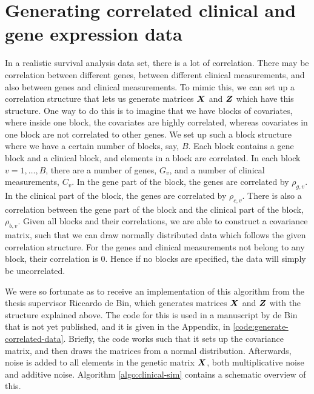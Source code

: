 \section{Generating correlated clinical and gene expression data}
\label{sec:generating-correlated-data}
In a realistic survival analysis data set, there is a lot of correlation.
There may be correlation between different genes, between different clinical measurements, and also between genes and clinical measurements.
To mimic this, we can set up a correlation structure that lets us generate matrices $\bm{X}$ and $\bm{Z}$ which have this structure.
One way to do this is to imagine that we have blocks of covariates, where inside one block, the covariates are highly correlated, whereas covariates in one block are not correlated to other genes.
We set up such a block structure where we have a certain number of blocks, say, $B$.
Each block contains a gene block and a clinical block, and elements in a block are correlated.
In each block $v=1,\ldots,B$, there are a number of genes, $G_v$, and a number of clinical measurements, $C_v$.
In the gene part of the block, the genes are correlated by $\rho_{g,v}$.
In the clinical part of the block, the genes are correlated by $\rho_{c,v}$.
There is also a correlation between the gene part of the block and the clinical part of the block, $\rho_{b,v}$.
Given all blocks and their correlations, we are able to construct a covariance matrix, such that we can draw normally distributed data which follows the given correlation structure.
For the genes and clinical measurements not belong to any block, their correlation is 0.
Hence if no blocks are specified, the data will simply be uncorrelated.

We were so fortunate as to receive an implementation of this algorithm from the thesis supervisor Riccardo de Bin, which generates matrices $\bm{X}$ and $\bm{Z}$ with the structure explained above.
The code for this is used in a manuscript by de Bin that is not yet published, and it is given in the Appendix, in \ref{code:generate-correlated-data}.
Briefly, the code works such that it sets up the covariance matrix, and then draws the matrices from a normal distribution.
Afterwards, noise is added to all elements in the genetic matrix $\bm{X}$, both multiplicative noise and additive noise.
Algorithm \ref{algo:clinical-sim} contains a schematic overview of this.

